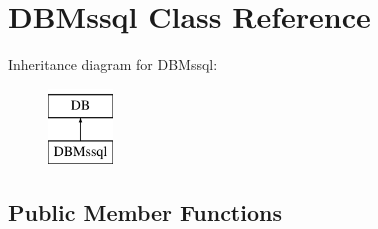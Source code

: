 \hypertarget{classDBMssql}{\section{D\-B\-Mssql Class Reference}
\label{classDBMssql}
}
Inheritance diagram for D\-B\-Mssql\-:\begin{figure}[H]
\begin{center}
\leavevmode
\includegraphics[height=2.000000cm]{classDBMssql}
\end{center}
\end{figure}
\subsection*{Public Member Functions}
